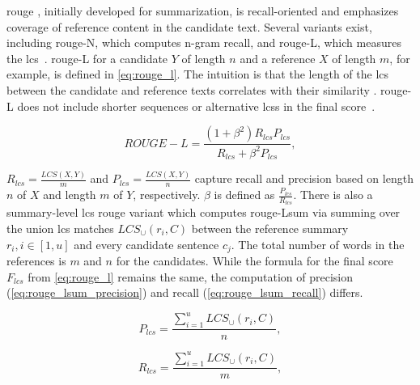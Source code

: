 \ac{rouge} \citep{lin_rouge_2004}, initially developed for summarization, is recall-oriented and emphasizes coverage of reference content in the candidate text. 
Several variants exist, including \ac{rouge}-N, which computes n-gram recall, and \ac{rouge}-L, which measures the \ac{lcs}~\citep{zhou_paraphrase_2021,palivela_optimization_2021,kurt_pehlivanoglu_comparative_2024}. 
\ac{rouge}-L for a candidate $Y$ of length $n$ and a reference $X$ of length $m$, for example, is defined in \autoref{eq:rouge_l}.
The intuition is that the length of the \ac{lcs} between the candidate and reference texts correlates with their similarity \citep{lin_rouge_2004}.
\ac{rouge}-L does not include shorter sequences or alternative \acp{lcs} in the final score~\citep{lin_rouge_2004}.

\begin{equation}
ROUGE-L = \frac{(1 + \beta^2)R_{lcs}P_{lcs}}{R_{lcs} + \beta^2 P_{lcs}},
\label{eq:rouge_l}
\end{equation}

$R_{lcs} = \frac{LCS(X,Y)}{m}$ and $P_{lcs} = \frac{LCS(X,Y)}{n}$ capture recall and precision based on length $n$ of $X$ and length $m$ of $Y$, respectively.
$\beta$ is defined as $\frac{P_{lcs}}{R_{lcs}}$.
There is also a summary-level \ac{lcs} \ac{rouge} variant which computes \ac{rouge}-Lsum via summing over the union \ac{lcs} matches $LCS_\cup(r_i,C)$ between the reference summary $r_i, i \in [1,u]$ and every candidate sentence $c_j$.
The total number of words in the references is $m$ and $n$ for the candidates.
While the formula for the final score $F_{lcs}$ from \autoref{eq:rouge_l} remains the same, the computation of precision (\autoref{eq:rouge_lsum_precision}) and recall (\autoref{eq:rouge_lsum_recall}) differs.

\begin{equation}
P_{lcs} = \frac{\sum_{i=1}^{u}LCS_\cup(r_i,C)}{n},
\label{eq:rouge_lsum_precision}
\end{equation}

\begin{equation}
R_{lcs} = \frac{\sum_{i=1}^{u}LCS_\cup(r_i,C)}{m},
\label{eq:rouge_lsum_recall}
\end{equation}


